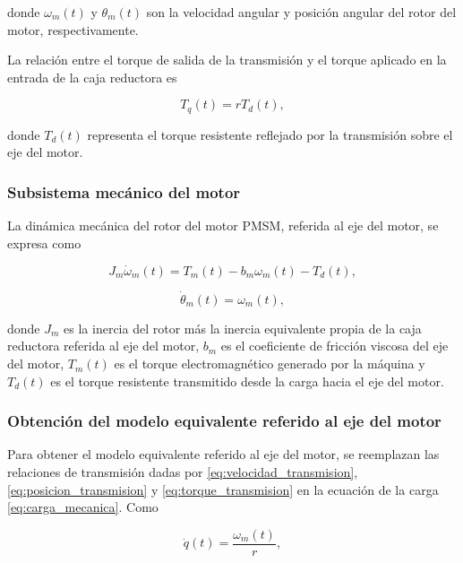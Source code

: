 \documentclass[10pt,a4paper]{article}
\begin{document}
donde \(\omega_m(t)\) y \(\theta_m(t)\) son la velocidad angular y posición angular del rotor del motor, respectivamente.

La relación entre el torque de salida de la transmisión y el torque aplicado en la entrada de la caja reductora es

\begin{equation}
    T_q(t)
    =
    r T_d(t),
    \label{eq:torque_transmision}
\end{equation}

donde \(T_d(t)\) representa el torque resistente reflejado por la transmisión sobre el eje del motor.

\subsubsection{Subsistema mecánico del motor}

La dinámica mecánica del rotor del motor PMSM, referida al eje del motor, se expresa como

\begin{equation}
    J_m \dot{\omega}_m(t)
    =
    T_m(t)
    -
    b_m \omega_m(t)
    -
    T_d(t),
    \label{eq:mecanica_motor}
\end{equation}

\begin{equation}
    \dot{\theta}_m(t)
    =
    \omega_m(t),
    \label{eq:posicion_motor}
\end{equation}

donde \(J_m\) es la inercia del rotor más la inercia equivalente propia de la caja reductora referida al eje del motor, \(b_m\) es el coeficiente de fricción viscosa del eje del motor, \(T_m(t)\) es el torque electromagnético generado por la máquina y \(T_d(t)\) es el torque resistente transmitido desde la carga hacia el eje del motor.

\subsubsection{Obtención del modelo equivalente referido al eje del motor}

Para obtener el modelo equivalente referido al eje del motor, se reemplazan las relaciones de transmisión dadas por \eqref{eq:velocidad_transmision}, \eqref{eq:posicion_transmision} y \eqref{eq:torque_transmision} en la ecuación de la carga \eqref{eq:carga_mecanica}. Como

\begin{equation}
    \dot{q}(t)
    =
    \frac{\omega_m(t)}{r},
\end{equation}
\end{document}
